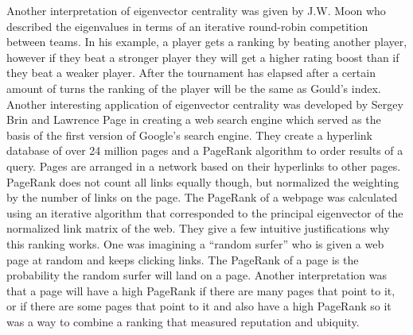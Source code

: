 \documentclass{article}
\theoremstyle{definition}
\theoremstyle{remark}
\begin{document}
Another interpretation of eigenvector centrality was given by J.W. Moon who described the eigenvalues in terms of an iterative round-robin competition between teams.  In his example, a player gets a ranking by beating another player, however if they beat a stronger player they will get a higher rating boost than if they beat a weaker player.  After the tournament has elapsed after a certain amount of turns the ranking of the player will be the same as Gould’s index.\\

Another interesting application of eigenvector centrality was developed by Sergey Brin and Lawrence Page in creating a web search engine which served as the basis of the first version of Google’s search engine.  They create a hyperlink database of over 24 million pages and a PageRank algorithm to order results of a query.  Pages are arranged in a network based on their hyperlinks to other pages.  PageRank does not count all links equally though, but normalized the weighting by the number of links on the page.  The PageRank of a webpage was calculated using an iterative algorithm that corresponded to the principal eigenvector of the normalized link matrix of the web.  They give a few intuitive justifications why this ranking works.  One was imagining a “random surfer” who is given a web page at random and keeps clicking links.  The PageRank of a page is the probability the random surfer will land on a page.  Another interpretation was that a page will have a high PageRank if there are many pages that point to it, or if there are some pages that point to it and also have a high PageRank so it was a way to combine a ranking that measured reputation and ubiquity.\\
\end{document}
